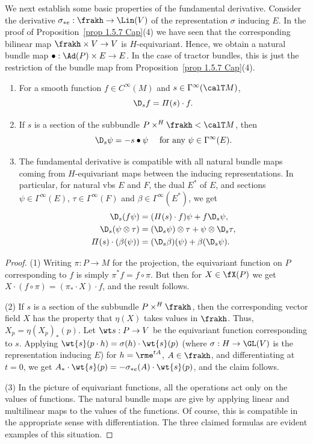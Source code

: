 We next establish some basic properties of the fundamental derivative. Consider the derivative $\sigma_{\ast e}:\frakh\to \Lin(V)$ of the representation $\sigma$ inducing $E$. In the proof of Proposition~\ref{prop 1.5.7 Cap}(4) we have seen that the corresponding bilinear map $\frakh\times V\to V$ is $H$-equivariant. Hence, we obtain a natural bundle map $\bullet:\Ad(P)\times E\to E$. In the case of tractor bundles, this is just the restriction of the bundle map from Proposition~\ref{prop 1.5.7 Cap}(4).

\begin{prop}\label{prop 1.5.8 Cap}
    \begin{enumerate}[label=(\arabic*)]
        \item For a smooth function $f\in C^\infty(M)$ and $s\in \Gamma^\infty(\calT M)$, 
        \[\D_s f=\varPi(s)\cdot f.\]
        \item If $s$ is a section of the subbundle $P\times^H\frakh<\calT M$, then 
        \[\D_s \psi=-s\bullet\psi\quad \text{ for any }\psi\in \Gamma^\infty(E).\]
        \item The fundamental derivative is compatible with all natural bundle maps coming from $H$-equivariant maps between the inducing representations. In particular, for natural \glspl{vb} $E$ and $F$, the dual $E^\ast$ of $E$, and sections $\psi\in\Gamma^\infty(E)$, $\tau\in\Gamma^\infty(F)$ and $\beta\in\Gamma^\infty(E^\ast)$, we get 
        \begin{align}
            \D_s(f\psi)&=(\varPi(s)\cdot f)\psi+f\D_s\psi,\\
            \D_s(\psi\otimes\tau)&=(\D_s \psi)\otimes\tau +\psi\otimes\D_s\tau,\\
            \varPi(s)\cdot(\beta(\psi))&=(\D_s\beta)(\psi)+\beta(\D_s\psi).
        \end{align}
    \end{enumerate}
\end{prop}
\begin{proof}
    (1) Writing $\pi:P\to M$ for the projection, the equivariant function on $P$ corresponding to $f$ is simply $\pi^\ast f=f\circ \pi$. But then for $X\in\fX(P)$ we get $X\cdot (f\circ \pi)=(\pi_\ast\cdot X)\cdot f$, and the result follows.

    (2) If $s$ is a section of the subbundle $P\times^H\frakh$, then the corresponding vector field $X$ has the property that $\eta(X)$ takes values in $\frakh$. Thus, $X_p=\eta(X_p)_\ast(p)$. Let $\wt s:P\to V$ be the equivariant function corresponding to $s$. Applying $\wt{s}(p\cdot h)=\sigma(h)\cdot \wt{s}(p)$ (where $\sigma:H\to \GL(V)$ is the representation inducing $E$) for $h=\rme^{tA}$, $A\in\frakh$, and differentiating at $t=0$, we get $A_\ast\cdot \wt{s}(p)=-\sigma_{\ast e}(A)\cdot \wt{s}(p)$, and the claim follows. 

    (3) In the picture of equivariant functions, all the operations act only on the values of functions. The natural bundle maps  are give by applying linear and multilinear maps to the values of the functions. Of course, this is compatible in the appropriate sense with differentiation. The three claimed formulas are evident examples of this situation.
\end{proof}

